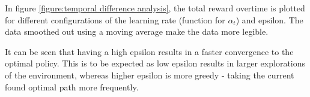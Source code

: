 In figure \ref{figure:temporal difference analysis}, the total reward
overtime is plotted for different configurations of the learning rate
(function for $\alpha_t$) and epsilon. The data smoothed out 
using a moving average make the data more legible.

It can be seen that having a high epsilon results in a faster 
convergence to the optimal policy. This is to be expected as 
low epsilon results in larger explorations of the environment,
whereas higher epsilon is more greedy - taking the current found 
optimal path more frequently. 